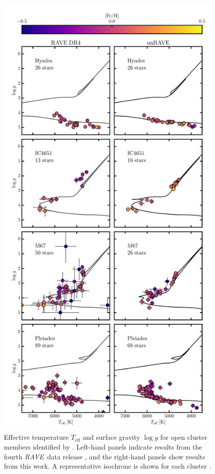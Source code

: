 \documentclass[preprint]{aastex}
\newcommand{\acronym}[1]{{\small{#1}}}
\newcommand{\project}[1]{\textsl{#1}}
\newcommand{\rave}{\project{\acronym{RAVE}}}
\newcommand{\teff}{T_{\mathrm{eff}}}
\newcommand{\logg}{\log g}
\begin{document}
\begin{figure}[p]
\center
\includegraphics[height=\textheight]{open-clusters.pdf}
\caption{Effective temperature $\teff$ and surface gravity $\logg$ for open cluster members identified by \citep{Kunder_2016}.  Left-hand panels indicate results from the fourth \rave\ data release \citep{Kordopatis_2013}, and the right-hand panels show results from this work.  A representative isochrone is shown for each cluster \citep{Bressan_2012}.\label{fig:open-cluster-HRD}}
\end{figure}
\end{document}
